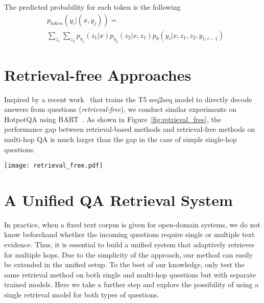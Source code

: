 The predicted probability for each token is the following
\begin{align*}
& p_{\textit{token}}(y_{i}|(x, y_{j})) = \\
& \sum_{z_1}  \sum_{z_2} p_{\eta_1}(z_1|x) p_{\eta_2}(z_2|x, z_1) p_\theta(y_i|x, z_1, z_2, y_{1:i-1})
\end{align*}

\section{Retrieval-free Approaches}
\label{appendix:retrieval_free}
Inspired by a recent work~\citep{t5close} that trains the T5 seq2seq model to directly decode answers from  questions (\textit{retrieval-free}), we conduct similar experiments on HotpotQA using BART~\citep{BART}. As shown in Figure~\ref{fig:retrieval_free}, the performance gap between retrieval-based methods and retrieval-free methods on multi-hop QA is much larger than the gap in the case of simple single-hop questions. 

\begin{figure*}[h]
\centering
\texttt{[image: retrieval\_free.pdf]}
\vspace{-0.2in}
\caption{Performance gap between retrieval-free and retrieval-based methods on different QA datasets.}
\label{fig:retrieval_free}
\end{figure*}

\section{A Unified QA Retrieval System}

In practice, when a fixed text corpus is given for open-domain systems, we do not know beforehand whether the incoming questions require single or multiple text evidence. Thus, it is essential to build a unified system that adaptively retrieves for multiple hops. Due to the simplicity of the approach, our method can easily be extended in the unified setup. To the best of our knowledge, only \citep{GraphRecurrentRetriever} test the same retrieval method on both single and multi-hop questions but with separate trained models. Here we take a further step and explore the possibility of using a single retrieval model for both types of questions.
 
